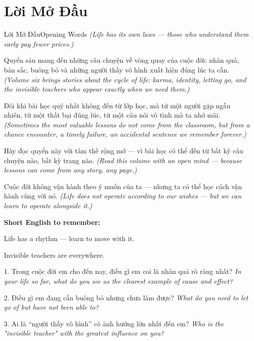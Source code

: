 \chapter*{Lời Mở Đầu}

\begin{truyen}{Lời Mở Đầu}{Opening Words}
\textit{(Life has its own laws --- those who understand them early pay fewer prices.)}

Quyển sáu mang đến những câu chuyện về vòng quay của cuộc đời: nhân quả, bản sắc, buông bỏ và những người thầy vô hình xuất hiện đúng lúc ta cần.
\textit{(Volume six brings stories about the cycle of life: karma, identity, letting go, and the invisible teachers who appear exactly when we need them.)}

Đôi khi bài học quý nhất không đến từ lớp học, mà từ một người gặp ngẫu nhiên, từ một thất bại đúng lúc, từ một câu nói vô tình mà ta nhớ mãi.
\textit{(Sometimes the most valuable lessons do not come from the classroom, but from a chance encounter, a timely failure, an accidental sentence we remember forever.)}

Hãy đọc quyển này với tâm thế rộng mở — vì bài học có thể đến từ bất kỳ câu chuyện nào, bất kỳ trang nào.
\textit{(Read this volume with an open mind --- because lessons can come from any story, any page.)}
\end{truyen}

\begin{baihoc}
Cuộc đời không vận hành theo ý muốn của ta --- nhưng ta có thể học cách vận hành cùng với nó.
\textit{(Life does not operate according to our wishes --- but we can learn to operate alongside it.)}
\end{baihoc}

\begin{tcolorbox}[colback=truyenblue!6,colframe=truyenblue,coltitle=white,fonttitle=\bfseries,title={Easy English},arc=4pt,boxrule=1pt,breakable]
\textbf{Short English to remember:}

Life has a rhythm --- learn to move with it.

Invisible teachers are everywhere.
\end{tcolorbox}

\begin{tcolorbox}[colback=truyengold!10,colframe=truyengold!70!black,coltitle=black,fonttitle=\bfseries,title={Tự Học Nhanh},arc=4pt,boxrule=1pt,breakable]
1. Trong cuộc đời em cho đến nay, điều gì em coi là nhân quả rõ ràng nhất? \textit{In your life so far, what do you see as the clearest example of cause and effect?}

2. Điều gì em đang cần buông bỏ nhưng chưa làm được? \textit{What do you need to let go of but have not been able to?}

3. Ai là ``người thầy vô hình'' có ảnh hưởng lớn nhất đến em? \textit{Who is the "invisible teacher" with the greatest influence on you?}
\end{tcolorbox}

\ngancach
